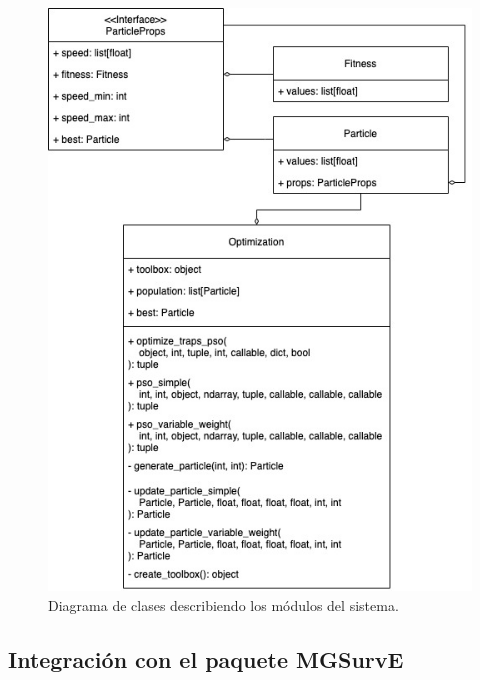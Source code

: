 \documentclass[letterpaper]{report}
\begin{document}
    \begin{figure}[ht!]
      \includegraphics[width=\textwidth]{optimization-modules.jpeg}
      \caption{Diagrama de clases describiendo los módulos del sistema.}
      \label{fig:optimization-modules}
    \end{figure}

    \subsection{Integración con el paquete MGSurvE}
\end{document}
